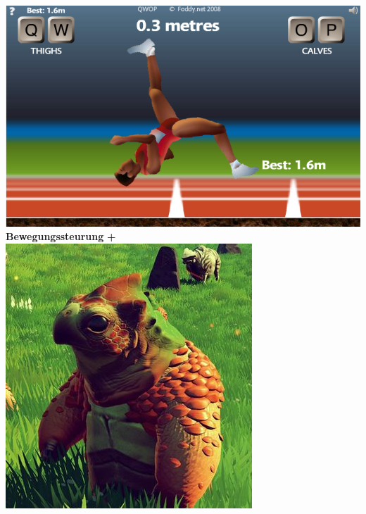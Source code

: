 \documentclass{beamer}
\begin{document}
\begin{frame}
	\begin{columns}[c]
		\centering		
		\includegraphics[width=\textwidth]{img/games/qwop.png} \\
		\vspace{1.5em}
		\textbf{Bewegungssteurung}
		\centering
		\textbf{\huge +}
		\centering
		\includegraphics[width=\textwidth]{img/games/nms3.png} \\

\end{columns}
\end{frame}
\end{document}

